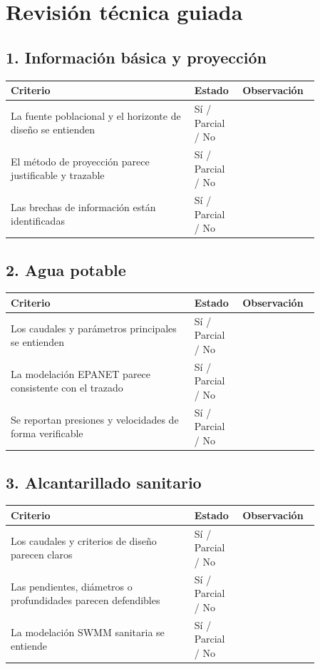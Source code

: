 \documentclass[11pt]{article}
\begin{document}
\section{Revisi\'on t\'ecnica guiada}
\subsection*{1. Informaci\'on b\'asica y proyecci\'on}
\begin{tabular}{p{0.54\linewidth} p{0.12\linewidth} p{0.20\linewidth}}
\toprule
\textbf{Criterio} & \textbf{Estado} & \textbf{Observaci\'on} \\
\midrule
La fuente poblacional y el horizonte de dise\~no se entienden & S\'i / Parcial / No & \\
El m\'etodo de proyecci\'on parece justificable y trazable & S\'i / Parcial / No & \\
Las brechas de informaci\'on est\'an identificadas & S\'i / Parcial / No & \\
\bottomrule
\end{tabular}

\subsection*{2. Agua potable}
\begin{tabular}{p{0.54\linewidth} p{0.12\linewidth} p{0.20\linewidth}}
\toprule
\textbf{Criterio} & \textbf{Estado} & \textbf{Observaci\'on} \\
\midrule
Los caudales y par\'ametros principales se entienden & S\'i / Parcial / No & \\
La modelaci\'on EPANET parece consistente con el trazado & S\'i / Parcial / No & \\
Se reportan presiones y velocidades de forma verificable & S\'i / Parcial / No & \\
\bottomrule
\end{tabular}

\subsection*{3. Alcantarillado sanitario}
\begin{tabular}{p{0.54\linewidth} p{0.12\linewidth} p{0.20\linewidth}}
\toprule
\textbf{Criterio} & \textbf{Estado} & \textbf{Observaci\'on} \\
\midrule
Los caudales y criterios de dise\~no parecen claros & S\'i / Parcial / No & \\
Las pendientes, di\'ametros o profundidades parecen defendibles & S\'i / Parcial / No & \\
La modelaci\'on SWMM sanitaria se entiende & S\'i / Parcial / No & \\
\bottomrule
\end{tabular}
\end{document}
